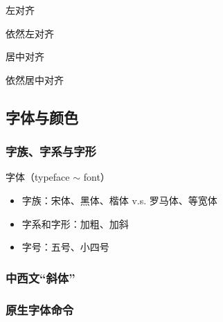 \documentclass{ctexart}
\begin{document}
            {\raggedright 左对齐\par
            依然左对齐\par
            }

            {\centering 居中对齐
            \par 依然居中对齐
            
            }


    \subsection{字体与颜色}
        \subsubsection{字族、字系与字形}
            字体（typeface $\sim$ font）
            \begin{itemize}
                \item 字族：宋体、黑体、楷体 v.s. 罗马体、等宽体
                \item 字系和字形：加粗、加斜
                \item 字号：五号、小四号
            \end{itemize}

        \subsubsection{中西文“斜体”}
        \subsubsection{原生字体命令}
        
\end{document}
